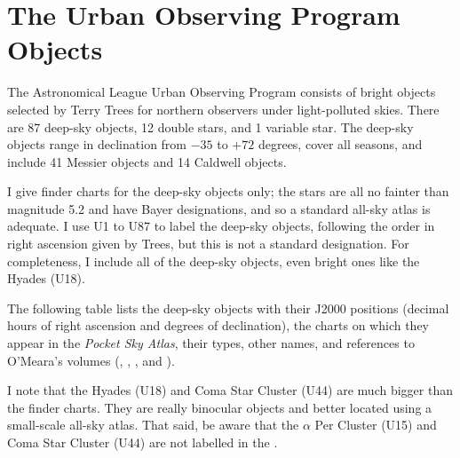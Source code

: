 
\chapter{The Urban Observing Program Objects}

The Astronomical League Urban Observing Program consists of bright objects selected by Terry Trees for northern observers under light-polluted skies. There are 87 deep-sky objects, 12 double stars, and 1 variable star. The deep-sky objects range in declination from $-35$ to $+72$ degrees, cover all seasons, and include 41 Messier objects and 14 Caldwell objects.  

I give finder charts for the deep-sky objects only; the stars are all no fainter than magnitude 5.2 and have Bayer designations, and so a standard all-sky atlas is adequate. I use U1 to U87 to label the deep-sky objects, following the order in right ascension given by Trees, but this is not a standard designation.  For completeness, I include all of the deep-sky objects, even bright ones like the Hyades (U18).

The following table lists the deep-sky objects with their J2000 positions (decimal hours of right ascension and degrees of declination), the charts on which they appear in the \emph{Pocket Sky Atlas}, their types, other names, and references to O’Meara’s  volumes (, , , and ).

I note that the Hyades (U18) and Coma Star Cluster (U44) are much bigger than the finder charts. They are really binocular objects and better located using a small-scale all-sky atlas. That said, be aware that the $\alpha$ Per Cluster (U15) and Coma Star Cluster (U44) are not labelled in the {\PSA}. 

\clearpage

